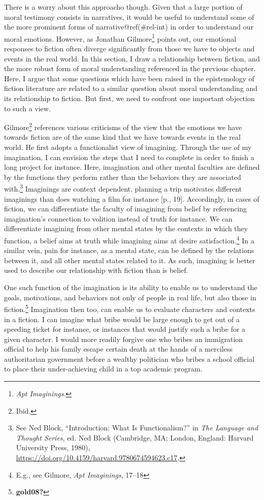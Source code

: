\documentclass[phdthesis,12pt,final]{wuthesis}
\theoremstyle{definition}
\theoremstyle{definition}
\theoremstyle{definition}
\theoremstyle{definition}
\theoremstyle{remark}
\begin{document}
There is a worry about this approacho though. Given that a large portion of moral testimony consists in narratives, it would be useful to understand some of the more prominent forms of narrative@ref(\#rel-int) in order to understand our moral emotions. However, as Jonathan Gilmore\footnote{\emph{Apt {Imaginings}}.} points out, our emotional responses to fiction often diverge significantly from those we have to objects and events in the real world. In this section, I draw a relationship between fiction, and the more robust form of moral understanding referenced in the previous chapter. Here, I argue that some questions which have been raised in the epistemology of fiction literature are related to a similar question about moral understanding and its relationship to fiction. But first, we need to confront one important objection to such a view.

Gilmore\footnote{Ibid.} references various criticisms of the view that the emotions we have towards fiction are of the same kind that we have towards events in the real world. He first adopts a functionalist view of imagining. Through the use of my imagination, I can envision the steps that I need to complete in order to finish a long project for instance. Here, imagination and other mental faculties are defined by the functions they perform rather than the behaviors they are associated with.\footnote{See Ned Block, {``Introduction: What Is Functionalism?''} in \emph{The {Language} and {Thought Series}}, ed. Ned Block (Cambridge, MA; London, England: Harvard University Press, 1980), \url{https://doi.org/10.4159/harvard.9780674594623.c17}.} Imaginings are context dependent, planning a trip motivates different imaginings than does watching a film for instance {[}p., 19{]}. Accordingly, in cases of fiction, we can differentiate the faculty of imagining from belief by referencing imagination's connection to volition instead of truth for instance. We can differentiate imagining from other mental states by the contexts in which they function, a belief aims at truth while imagining aims at desire satisfaction.\footnote{E.g., see Gilmore, \emph{Apt {Imaginings}}, 17--18} In a similar vein, pain for instance, as a mental state, can be defined by the relations between it, and all other mental states related to it. As such, imagining is better used to describe our relationship with fiction than is belief.

One such function of the imagination is its ability to enable us to understand the goals, motivations, and behaviors not only of people in real life, but also those in fiction.\footnote{\textbf{gold08?}} Imagination then too, can enable us to evaluate characters and contexts in a fiction. I can imagine what bribe would be large enough to get out of a speeding ticket for instance, or instances that would justify such a bribe for a given character. I would more readily forgive one who bribes an immigration official to help his family escape certain death at the hands of a merciless authoritarian government before a wealthy politician who bribes a school official to place their under-achieving child in a top academic program.
\end{document}
